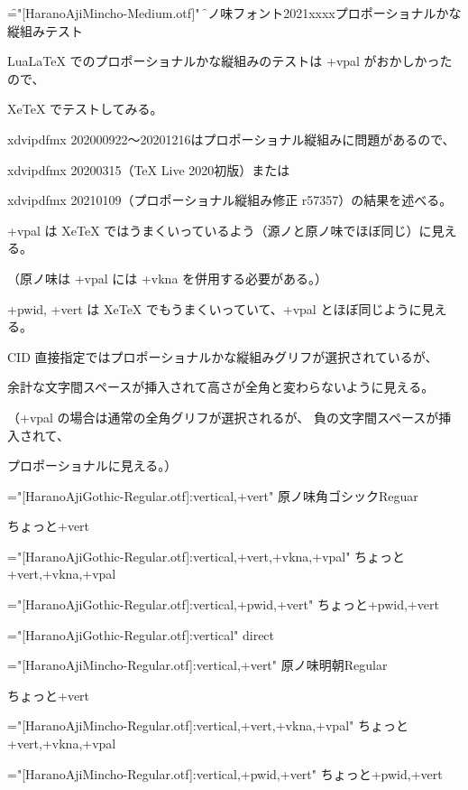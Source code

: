 

\font\f="[HaranoAjiMincho-Medium.otf]"
\f

原ノ味フォント2021xxxxプロポーショナルかな縦組みテスト

LuaLaTeX でのプロポーショナルかな縦組みのテストは +vpal がおかしかったので、

XeTeX でテストしてみる。

xdvipdfmx 202000922～20201216はプロポーショナル縦組みに問題があるので、

xdvipdfmx 20200315（TeX Live 2020初版）または

xdvipdfmx 20210109（プロポーショナル縦組み修正 r57357）の結果を述べる。

+vpal は XeTeX ではうまくいっているよう（源ノと原ノ味でほぼ同じ）に見える。

（原ノ味は +vpal には +vkna を併用する必要がある。）

+pwid, +vert は XeTeX でもうまくいっていて、+vpal とほぼ同じように見える。

CID 直接指定ではプロポーショナルかな縦組みグリフが選択されているが、

余計な文字間スペースが挿入されて高さが全角と変わらないように見える。

（+vpal の場合は通常の全角グリフが選択されるが、
負の文字間スペースが挿入されて、

プロポーショナルに見える。）

\font\hgr="[HaranoAjiGothic-Regular.otf]:vertical,+vert"
\hgr
原ノ味角ゴシックReguar

ちょっと+vert

\font\hgrvpal="[HaranoAjiGothic-Regular.otf]:vertical,+vert,+vkna,+vpal"
\hgrvpal
ちょっと+vert,+vkna,+vpal

\font\hgrpwidvert="[HaranoAjiGothic-Regular.otf]:vertical,+pwid,+vert"
\hgrpwidvert
ちょっと+pwid,+vert

\font\hgrdirect="[HaranoAjiGothic-Regular.otf]:vertical"
\hgrdirect
{}%
direct

\font\hmr="[HaranoAjiMincho-Regular.otf]:vertical,+vert"
\hmr
原ノ味明朝Regular

ちょっと+vert

\font\hmrvpal="[HaranoAjiMincho-Regular.otf]:vertical,+vert,+vkna,+vpal"
\hmrvpal
ちょっと+vert,+vkna,+vpal

\font\hmrpwidvert="[HaranoAjiMincho-Regular.otf]:vertical,+pwid,+vert"
\hmrpwidvert
ちょっと+pwid,+vert

